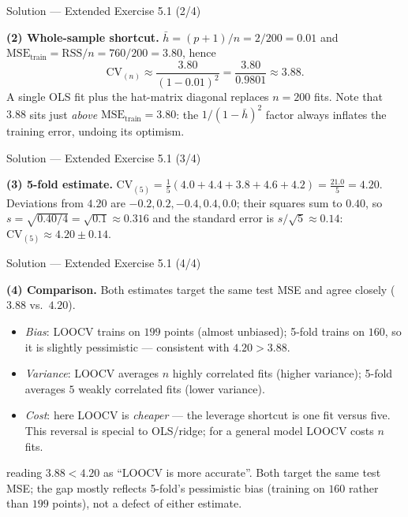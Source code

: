 \documentclass[aspectratio=169,11pt]{beamer}
\begin{document}
\begin{frame}{Solution --- Extended Exercise 5.1 (2/4)}
  \begin{solutionbox}
    \textbf{(2) Whole-sample shortcut.}
    $\bar h=(p+1)/n=2/200=0.01$ and
    $\mathrm{MSE}_{\text{train}}=\mathrm{RSS}/n=760/200=3.80$, hence
    \[
      \mathrm{CV}_{(n)}\approx\frac{3.80}{(1-0.01)^2}
      =\frac{3.80}{0.9801}\approx 3.88 .
    \]
    A single OLS fit plus the hat-matrix diagonal replaces $n=200$ fits.
    Note that $3.88$ sits just \emph{above}
    $\mathrm{MSE}_{\text{train}} = 3.80$: the $1/(1-\bar h)^2$ factor
    always inflates the training error, undoing its optimism.
  \end{solutionbox}
\end{frame}

\begin{frame}{Solution --- Extended Exercise 5.1 (3/4)}
  \begin{solutionbox}
    \textbf{(3) 5-fold estimate.}
    $\mathrm{CV}_{(5)}=\tfrac15(4.0+4.4+3.8+4.6+4.2)=\tfrac{21.0}{5}=4.20$.
    Deviations from $4.20$ are $-0.2,0.2,-0.4,0.4,0.0$; their squares sum
    to $0.40$, so $s=\sqrt{0.40/4}=\sqrt{0.1}\approx0.316$ and the
    standard error is $s/\sqrt5\approx0.14$: $\mathrm{CV}_{(5)}\approx
    4.20\pm0.14$.
  \end{solutionbox}
\end{frame}

\begin{frame}{Solution --- Extended Exercise 5.1 (4/4)}
  \begin{solutionbox}
    \textbf{(4) Comparison.} Both estimates target the same test MSE and
    agree closely ($3.88$ vs.\ $4.20$).
    \begin{itemize}
      \item \emph{Bias}: LOOCV trains on $199$ points (almost unbiased);
            5-fold trains on $160$, so it is slightly pessimistic ---
            consistent with $4.20>3.88$.
      \item \emph{Variance}: LOOCV averages $n$ highly correlated fits
            (higher variance); 5-fold averages $5$ weakly correlated
            fits (lower variance).
      \item \emph{Cost}: here LOOCV is \emph{cheaper} --- the leverage
            shortcut is one fit versus five. This reversal is special to
            OLS/ridge; for a general model LOOCV costs $n$ fits.
    \end{itemize}
  \end{solutionbox}
  \begin{mistake}
    reading $3.88 < 4.20$ as ``LOOCV is more
    accurate''. Both target the same test MSE; the gap mostly reflects
    5-fold's pessimistic bias (training on $160$ rather than $199$
    points), not a defect of either estimate.
  \end{mistake}
\end{frame}
\end{document}
